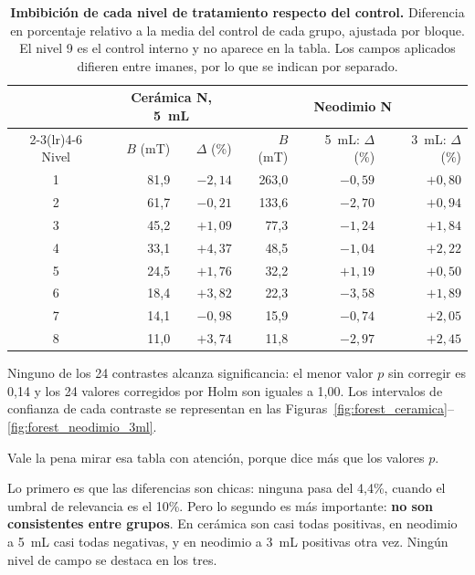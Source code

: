 \begin{table}[tbp]
\small
\setlength{\tabcolsep}{3pt}
\centering
\begin{threeparttable}
\caption[Imbibición de cada nivel de tratamiento respecto del control]{\textbf{Imbibición de cada nivel de tratamiento respecto del control.} Diferencia en porcentaje relativo a la media del control de cada grupo, ajustada por bloque. El nivel 9 es el control interno y no aparece en la tabla. Los campos aplicados difieren entre imanes, por lo que se indican por separado.}
\label{tab:imbibicion_niveles}
\begin{tabular}{crrrrr}
\toprule
 & \multicolumn{2}{c}{Cerámica N, 5~mL} & \multicolumn{3}{c}{Neodimio N} \\
\cmidrule(lr){2-3}\cmidrule(lr){4-6}
Nivel & \(B\) (mT) & \(\Delta\) (\%) & \(B\) (mT) & 5~mL: \(\Delta\) (\%) & 3~mL: \(\Delta\) (\%) \\
\midrule
1 & 81,9 & \(-2{,}14\) & 263,0 & \(-0{,}59\) & \(+0{,}80\) \\
2 & 61,7 & \(-0{,}21\) & 133,6 & \(-2{,}70\) & \(+0{,}94\) \\
3 & 45,2 & \(+1{,}09\) & 77,3  & \(-1{,}24\) & \(+1{,}84\) \\
4 & 33,1 & \(+4{,}37\) & 48,5  & \(-1{,}04\) & \(+2{,}22\) \\
5 & 24,5 & \(+1{,}76\) & 32,2  & \(+1{,}19\) & \(+0{,}50\) \\
6 & 18,4 & \(+3{,}82\) & 22,3  & \(-3{,}58\) & \(+1{,}89\) \\
7 & 14,1 & \(-0{,}98\) & 15,9  & \(-0{,}74\) & \(+2{,}05\) \\
8 & 11,0 & \(+3{,}74\) & 11,8  & \(-2{,}97\) & \(+2{,}45\) \\
\bottomrule
\end{tabular}
\begin{tablenotes}[flushleft]\footnotesize
  \item Ninguno de los 24 contrastes alcanza significancia: el menor valor \(p\) sin corregir es 0,14 y los 24 valores corregidos por Holm son iguales a 1,00. Los intervalos de confianza de cada contraste se representan en las Figuras~\ref{fig:forest_ceramica}--\ref{fig:forest_neodimio_3ml}.
\end{tablenotes}
\end{threeparttable}
\end{table}

Vale la pena mirar esa tabla con atención, porque dice más que los valores \(p\).

Lo primero es que las diferencias son chicas: ninguna pasa del 4{,}4\%, cuando el umbral de relevancia es el 10\%. Pero lo segundo es más importante: \textbf{no son consistentes entre grupos}. En cerámica son casi todas positivas, en neodimio a 5~mL casi todas negativas, y en neodimio a 3~mL positivas otra vez. Ningún nivel de campo se destaca en los tres.

